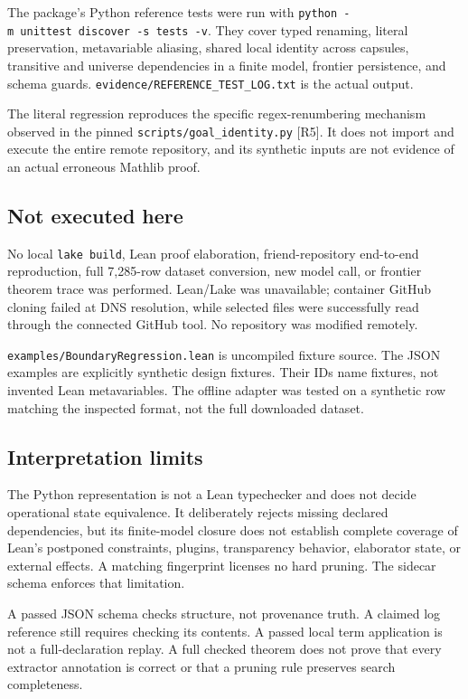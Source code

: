 \documentclass[
  10pt,
]{article}
\begin{document}
The package's Python reference tests were run with
\texttt{python\ -m\ unittest\ discover\ -s\ tests\ -v}. They cover typed
renaming, literal preservation, metavariable aliasing, shared local
identity across capsules, transitive and universe dependencies in a
finite model, frontier persistence, and schema guards.
\texttt{evidence/REFERENCE\_TEST\_LOG.txt} is the actual output.

The literal regression reproduces the specific regex-renumbering
mechanism observed in the pinned \texttt{scripts/goal\_identity.py}
{[}R5{]}. It does not import and execute the entire remote repository,
and its synthetic inputs are not evidence of an actual erroneous Mathlib
proof.

\subsection{Not executed here}\label{not-executed-here}

No local \texttt{lake\ build}, Lean proof elaboration, friend-repository
end-to-end reproduction, full 7,285-row dataset conversion, new model
call, or frontier theorem trace was performed. Lean/Lake was
unavailable; container GitHub cloning failed at DNS resolution, while
selected files were successfully read through the connected GitHub tool.
No repository was modified remotely.

\texttt{examples/BoundaryRegression.lean} is uncompiled fixture source.
The JSON examples are explicitly synthetic design fixtures. Their IDs
name fixtures, not invented Lean metavariables. The offline adapter was
tested on a synthetic row matching the inspected format, not the full
downloaded dataset.

\subsection{Interpretation limits}\label{interpretation-limits}

The Python representation is not a Lean typechecker and does not decide
operational state equivalence. It deliberately rejects missing declared
dependencies, but its finite-model closure does not establish complete
coverage of Lean's postponed constraints, plugins, transparency
behavior, elaborator state, or external effects. A matching fingerprint
licenses no hard pruning. The sidecar schema enforces that limitation.

A passed JSON schema checks structure, not provenance truth. A claimed
log reference still requires checking its contents. A passed local term
application is not a full-declaration replay. A full checked theorem
does not prove that every extractor annotation is correct or that a
pruning rule preserves search completeness.
\end{document}
